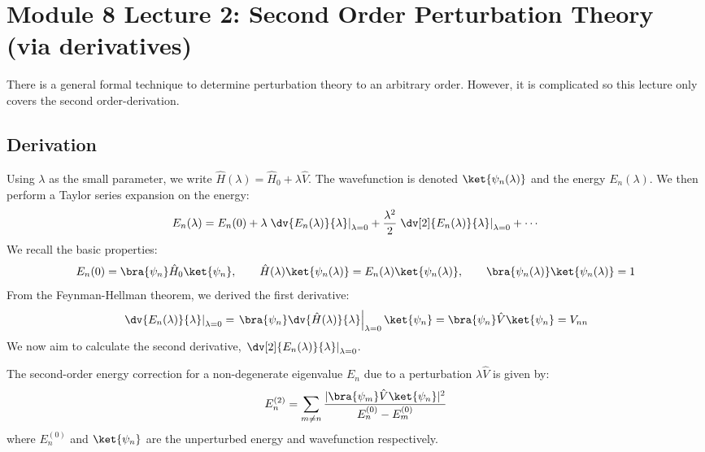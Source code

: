 \hr
\section{Module 8 Lecture 2: Second Order Perturbation Theory (via derivatives)}
There is a general formal technique to determine perturbation theory
to an arbitrary order. However, it is complicated so this lecture
only covers the second order-derivation.

\subsection{Derivation}
Using $\lambda$ as the small parameter, we write $\hat H(\lambda) =
\hat H_0 + \lambda \hat V$. The wavefunction is denoted
$\ket{\psi_n(\lambda)}$ and the energy $E_n(\lambda)$. We then
perform a Taylor series expansion on the energy:
\begin{equation} \label{eq:energy_taylor_expansion}
    E_n(\lambda) = E_n(0) + \lambda
    \left.\dv{E_n(\lambda)}{\lambda}\right|_{\lambda=0} +
    \frac{\lambda^2}{2}
    \left.\dv[2]{E_n(\lambda)}{\lambda}\right|_{\lambda=0} + \cdots
\end{equation}
We recall the basic properties:
\begin{equation} \label{eq:schrodinger_normalization_perturbed}
    E_n(0) = \bra{\psi_n} \hat H_0 \ket{\psi_n}, \quad\quad \hat
    H(\lambda)\ket{\psi_n(\lambda)} =
    E_n(\lambda)\ket{\psi_n(\lambda)}, \quad\quad
    \bra{\psi_n(\lambda)} \ket{\psi_n(\lambda)} = 1
\end{equation}
From the Feynman-Hellman theorem, we derived the first derivative:
\begin{equation} \label{eq:first_derivative_perturbation}
    \left.\dv{E_n(\lambda)}{\lambda}\right|_{\lambda=0} =
    \left.\bra{\psi_n}\dv{\hat
    H(\lambda)}{\lambda}\right|_{\lambda=0}\ket{\psi_n} =
    \bra{\psi_n}\hat V\ket{\psi_n} = V_{nn}
\end{equation}
We now aim to calculate the second derivative,
$\left.\dv[2]{E_n(\lambda)}{\lambda}\right|_{\lambda=0}$.

\begin{theorem}
    The second-order energy correction for a non-degenerate
    eigenvalue $E_n$ due to a perturbation $\lambda \hat V$ is given by:
    \begin{equation} \label{eq:second_order_energy_correction}
        E_n^{(2)} = \sum_{m \ne n} \frac{|\bra{\psi_m}\hat
        V\ket{\psi_n}|^2}{E_n^{(0)} - E_m^{(0)}}
    \end{equation}
    where $E_n^{(0)}$ and $\ket{\psi_n}$ are the unperturbed energy
    and wavefunction respectively.
\end{theorem}

